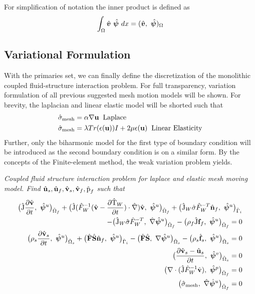 For simplification of notation the inner product is defined as
\begin{align*}
\int_{\Omega} \gat{v} \ \gat{\psi} \ dx = (\gat{v}, \ \gat{\psi})_{\Omega}
\end{align*}
 

\subsection{Variational Formulation}
With the primaries set, we can finally define the discretization of the monolithic coupled fluid-structure interaction problem. For full transparency, variation formulation of all previous suggested mesh motion models will be shown. For brevity, the laplacian and linear elastic model will be shorted such that 
\begin{align*}
&\hat{\sigma}_{\text{mesh}} = \alpha \nabla \mathbf{u} \hspace{2mm} \text{Laplace} \\
&\hat{\sigma}_{\text{mesh}} =  \lambda Tr(\epsilon(\mathbf{u})) I + 2 \mu \epsilon(\mathbf{u}) \hspace{2mm} \text{Linear Elasticity} 
\end{align*}
Further, only the biharmonic model for the first type of boundary condition will be introduced as the second boundary condition is on a similar form.
  By the concepts of the Finite-element method, the weak variation problem yields.

\begin{prob}
\textit{Coupled fluid structure interaction problem for laplace and elastic mesh moving model.
Find $\hat{\mathbf{u}}_s, \hat{\mathbf{u}}_f, \hat{\mathbf{v}}_s, \hat{\mathbf{v}}_f, \text{\^{p}}_f $ such that}
\begin{align*}
\big(\text{\^{J}} \frac{\partial \hat{\mathbf{v}}}{\partial t}, \ \hat{\bm{\psi}}^u \big)_{\hat{\Omega}_f} +
\big(\text{\^{J}} (\hat{F}_W^{-1}(\hat{\mathbf{v}} - \frac{\partial \text{\^{T}}_W}{\partial t}) \cdot \hat{\nabla}) \hat{\mathbf{v}}, \ {\hat{\bm{\psi}}^u} \big)_{\hat{\Omega}_f}
+ \big(\text{\^{J}}_W \hat{\sigma}\hat{F}_W^{-T} \hat{\mathbf{n}}_f, \ {\hat{\bm{\psi}}^u} \big)_{\hat{\Gamma}_i} \\
- \big(\text{\^{J}}_W \hat{\sigma}\hat{F}_W^{-T}, \ {\hat{\nabla}\hat{\bm{\psi}}^u} \big)_{\hat{\Omega}_f} -
\big(\rho_f \text{\^{J}} \mathbf{f}_f, \ {{\hat{\bm{\psi}}^u}} \big)_{\hat{\Omega}_f} = 0 \\
\big(\rho_s \frac{\partial \hat{\mathbf{v}}_s}{\partial t}, \ {\hat{\bm{\psi}}^u} \big)_{\hat{\Omega}_s} + \big(\hat{\mathbf{F}}\hat{\mathbf{S}}\hat{\mathbf{n}}_f, \ {\hat{\bm{\psi}}^u} \big)_{\hat{\Gamma}_i}
- \big(\hat{\mathbf{F}}\hat{\mathbf{S}}, \ {\nabla \hat{\bm{\psi}}^u} \big)_{\hat{\Omega}_s} - \big(\rho_s \hat{\mathbf{f}}_s, \ {\hat{\bm{\psi}}^u} \big)_{\hat{\Omega}_s} = 0 \\
\big(\frac{\partial \hat{\mathbf{v}}_s - \hat{\mathbf{u}}_s}{\partial t}, \ {\hat{\bm{\psi}}^v} \big)_{\hat{\Omega}_s}  = 0\\
\big(\nabla \cdot (\text{\^{J}} \hat{F}_W^{-1} \hat{\mathbf{v}}), \ {\hat{\bm{\psi}}^p} \big)_{\hat{\Omega}_f} = 0 \\
\big(\hat{\sigma}_{\text{mesh}}, \ {\hat{\nabla}\hat{\bm{\psi}}^u} \big)_{\hat{\Omega}_f} = 0
\end{align*} 
\end{prob}

